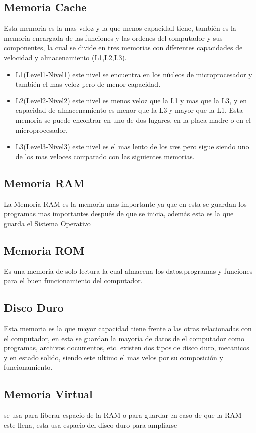 \documentclass{article}
\begin{document}
	\subsection{Memoria Cache}
	Esta memoria es la mas veloz y la que menos capacidad tiene, también es la memoria encargada de las funciones y las ordenes del computador y sus componentes, la cual se divide en tres memorias con diferentes capacidades de velocidad y almacenamiento  (L1,L2,L3).
	\begin{itemize}
		\item{L1(Level1-Nivel1) este nivel se encuentra en los núcleos de microprocesador y también el mas veloz pero de menor capacidad.}
		\item{L2(Level2-Nivel2) este nivel es menos veloz que la L1 y mas que la L3, y en capacidad de almacenamiento es menor que la L3 y mayor que la L1. Esta memoria se puede encontrar en uno de dos lugares, en la placa madre o en el microprocesador.}
		\item {L3(Level3-Nivel3) este nivel es el mas lento de los tres pero sigue siendo uno de los mas veloces comparado con las siguientes memorias.}
	\end{itemize}
	
	\subsection{Memoria RAM}
	La Memoria RAM es la memoria mas importante ya que en esta se guardan los programas mas importantes después de que se inicia, además esta es la que guarda el Sistema Operativo
	
	\subsection{Memoria ROM}
	Es una memoria de solo lectura la cual almacena los datos,programas y funciones para el buen funcionamiento del computador.\cite{rom}
	
	\subsection{Disco Duro}
	Esta memoria es la que mayor capacidad tiene frente a las otras relacionadas con el computador, en esta se guardan la mayoría de datos de el computador como programas, archivos documentos, etc. existen dos tipos de disco duro, mecánicos y en estado solido, siendo este ultimo el mas velos por su composición y funcionamiento.
	
	\subsection{Memoria Virtual}
	se usa para liberar espacio de la RAM o para guardar en caso de que la RAM este llena, esta usa espacio del disco duro para ampliarse
	
\end{document}
